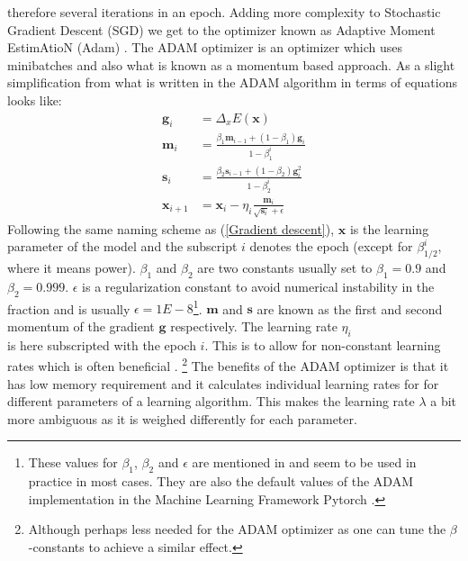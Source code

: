 therefore several iterations in an epoch.
Adding more complexity to Stochastic Gradient Descent (SGD) we get to the optimizer 
known as Adaptive Moment EstimAtioN (Adam) \citep{adam}. The ADAM optimizer is 
an optimizer which uses minibatches and also what is known as a momentum based approach.
As a slight simplification from what is written in \citet{fysstkweek40} the ADAM 
algorithm in terms of equations looks like:
\begin{align}
    \mathbf{g}_i &= \Delta_x E(\bm{x}) \label{ADAM.1} \\
    \bm{m}_i &= \frac{\beta_1 \bm{m}_{i-1} + (1 - \beta_1)\bm{g}_i}{1 - \beta_1^i} \\
    \bm{s}_i &= \frac{\beta_2 \bm{s}_{i-1} + (1-\beta_2)\bm{g}^2_i}{1 - \beta_2^i} \\
    \bm{x}_{i+1} &= \bm{x}_i - \eta_i \frac{\bm{m}_i}{\sqrt{\bm{s}_i}+ \epsilon} \label{ADAM.4}
\end{align}
Following the same naming scheme as (\ref{Gradient descent}), $\bm{x}$ is the 
learning parameter of the model and the subscript $i$ denotes the epoch (except 
for $\beta_{1/2}^i$, where it means power). 
$\beta_1$ and $\beta_2$ are two constants usually set to $\beta_1 = 0.9$ and 
$\beta_2 = 0.999$. $\epsilon$ is a regularization constant to avoid numerical 
instability in the fraction and is usually $\epsilon=1E-8$\footnote{These values 
for $\beta_1$, $\beta_2$ and $\epsilon$ are mentioned in \citet{adam} and seem 
to be used in practice in most cases. They are also the default values of the 
ADAM implementation in the Machine Learning Framework Pytorch \citep{NEURIPS2019_9015}.}.
$\bm{m}$ and $\bm{s}$ are known as the first and second momentum of the gradient 
$\bm{g}$ respectively. The learning rate $\eta_i$\\ is here subscripted with the 
epoch $i$. This is to allow for non-constant learning rates which is often beneficial \citationneeded.
\footnote{Although perhaps less needed for the ADAM optimizer as one can tune the 
$\beta$-constants to achieve a similar effect.}
The benefits of the ADAM optimizer is that it has low memory requirement and it calculates 
individual learning rates for for different parameters of a learning algorithm. 
This makes the learning rate $\lambda$ a bit more ambiguous as it is weighed 
differently for each parameter.
